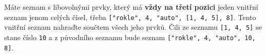 \question[50]
Máte seznam s libovolnými prvky, který má \textbf{vždy na třetí pozici} jeden
vnitřní seznam jenom celých čísel, třeba \texttt{["rokle", 4, "auto", [1, 4, 5],
			8]}. Tento vnitřní seznam nahraďte součtem všech jeho prvků. Čili ze seznamu
\texttt{[1, 4, 5]} se stane číslo \texttt{10} a z původního seznamu bude seznam
\texttt{["rokle", 4, "auto", 10, 8]}.
